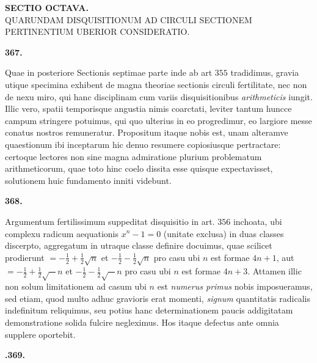 \clearpage{}
\renewcommand{\BookRunningTitle}{Sectio octava.}
\begin{center}
\textbf{SECTIO OCTAVA.}\\[1em]
QUARUNDAM DISQUISITIONUM AD CIRCULI SECTIONEM PERTINENTIUM UBERIOR CONSIDERATIO.
\end{center}
\par\medskip{}\centerline{\textbf{367.}}\nobreak\smallskip
Quae in posteriore Sectionis septimae parte inde ab art $355$ tradidimus, gravia utique specimina exhibent de magna theoriae sectionis circuli fertilitate, nec non de nexu miro, qui hanc disciplinam cum variis disquisitionibus \textit{arithmeticis} iungit. Illic vero, spatii temporisque angustia nimis coarctati, leviter tantum huncce campum stringere potuimus, qui quo ulterius in eo progredimur, eo largiore messe conatus nostros remuneratur. Propositum itaque nobis est, unam alteramve quaestionum ibi inceptarum hic denuo resumere copiosiusque pertractare: certoque lectores non sine magna admiratione plurium problematum arithmeticorum, quae toto hinc coelo dissita esse quisque expectavisset, solutionem huic fundamento inniti videbunt.
\par\medskip{}\centerline{\textbf{368.}}\nobreak\smallskip
Argumentum fertilissimum suppeditat disquisitio in art. $356$ inchoata, ubi complexu radicum aequationis $x^n-1=0$ (unitate exclusa) in duas classes discerpto, aggregatum in utraque classe definire docuimus, quae scilicet prodierunt $=-\frac12+\frac12\surd n$ et $-\frac12-\frac12\surd n$ pro casu ubi $n$ est formae $4n+1$, aut $=-\frac12+\frac12\surd -n$ et $-\frac12-\frac12\surd -n$ pro casu ubi $n$ est formae $4n+3$. Attamen illic non solum limitationem ad casum ubi $n$ est \textit{numerus primus} nobis imposueramus, sed etiam, quod multo adhuc gravioris erat momenti, \textit{signum} quantitatis radicalis indefinitum reliquimus, seu potius hanc determinationem paucis addigitatam demonstratione solida fulcire negleximus. Hos itaque defectus ante omnia supplere oportebit.
\par\medskip{}\centerline{\textbf{.369.}}\nobreak\smallskip

